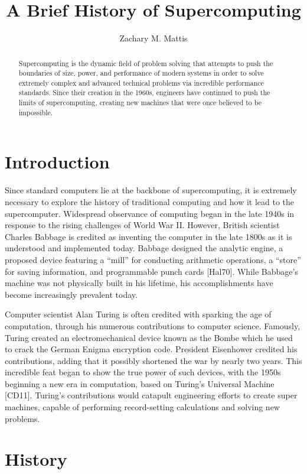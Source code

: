 \documentclass[12pt, letterpaper]{article}
\title{A Brief History of Supercomputing}
\author{Zachary M. Mattis}
\begin{document}
\maketitle

\begin{abstract}
Supercomputing is the dynamic field of problem solving that attempts to push the boundaries of size, power, and performance of modern systems in order to solve extremely complex and advanced technical problems via incredible performance standards. Since their creation in the 1960s, engineers have continued to push the limits of supercomputing, creating new machines that were once believed to be impossible. 

\end{abstract}

\section{Introduction}

Since standard computers lie at the backbone of supercomputing, it is extremely necessary to explore the history of traditional computing and how it lead to the supercomputer. Widespread observance of computing began in the late 1940s in response to the rising challenges of World War II. However, British scientist Charles Babbage is credited as inventing the computer in the late 1800s as it is understood and implemented today. Babbage designed the analytic engine, a proposed device featuring a “mill” for conducting arithmetic operations, a “store” for saving information, and programmable punch cards [Hal70]. While Babbage’s machine was not physically built in his lifetime, his accomplishments have become increasingly prevalent today.

Computer scientist Alan Turing is often credited with sparking the age of computation, through his numerous contributions to computer science. Famously, Turing created an electromechanical device known as the Bombe which he used to crack the German Enigma encryption code. President Eisenhower credited his contributions, adding that it possibly shortened the war by nearly two years. This incredible feat began to show the true power of such devices, with the 1950s beginning a new era in computation, based on Turing’s Universal Machine [CD11]. Turing’s contributions would catapult engineering efforts to create super machines, capable of performing record-setting calculations and solving new problems.

\section{History}
\end{document}
